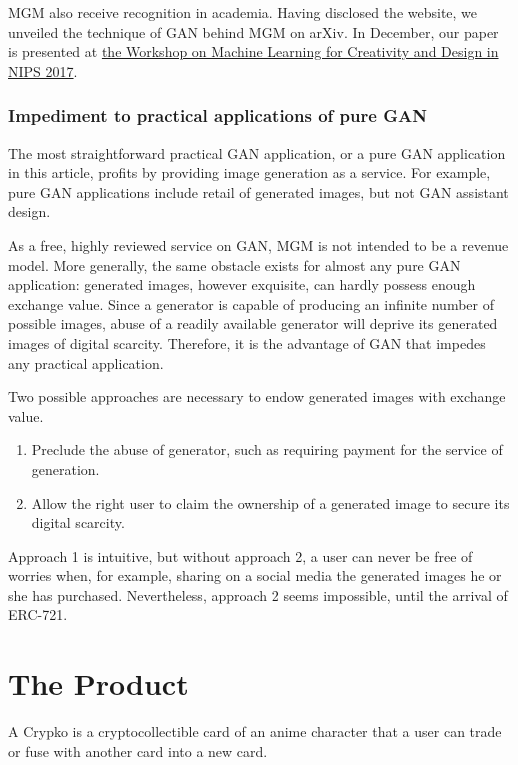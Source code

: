 \documentclass[b5paper]{article}
\begin{document}
MGM also receive recognition in academia. Having disclosed the website, we unveiled the technique of GAN behind MGM on arXiv\cite{jin2017towards}. In December, our paper is presented at \href{https://nips2017creativity.github.io/}{the Workshop on Machine Learning for Creativity and Design in NIPS 2017}.

\subsubsection{Impediment to practical applications of pure GAN}

The most straightforward practical GAN application, or a pure GAN application in this article, profits by providing image generation as a service. For example, pure GAN applications include retail of generated images, but not GAN assistant design.

As a free, highly reviewed service on GAN, MGM is not intended to be a revenue model. More generally, the same obstacle exists for almost any pure GAN application: generated images, however exquisite, can hardly possess enough exchange value. Since a generator is capable of producing an infinite number of possible images, abuse of a readily available generator will deprive its generated images of digital scarcity. Therefore, it is the advantage of GAN that impedes any practical application.

Two possible approaches are necessary to endow generated images with exchange value.

\begin{enumerate}
\item Preclude the abuse of generator, such as requiring payment for the service of generation.
\item Allow the right user to claim the ownership of a generated image to secure its digital scarcity.
\end{enumerate}

Approach 1 is intuitive, but without approach 2, a user can never be free of worries when, for example, sharing on a social media the generated images he or she has purchased. Nevertheless, approach 2 seems impossible, until the arrival of ERC-721. 

\section{The Product}

A Crypko is a cryptocollectible card of an anime character that a user can trade or fuse with another card into a new card.
\end{document}
